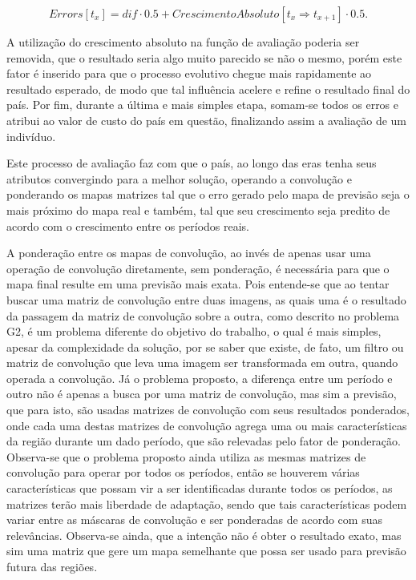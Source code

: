 \begin{equation}
\label{eq:forecasVectortError}
	Errors[t_x] = dif \cdot 0.5 + CrescimentoAbsoluto[t_x \Rightarrow t_{x+1}] \cdot 0.5.
\end{equation}

	A utilização do crescimento absoluto na função de avaliação poderia ser removida, que o resultado seria algo muito parecido se não o mesmo, porém este fator é inserido para que o processo evolutivo chegue mais rapidamente ao resultado esperado, de modo que tal influência acelere e refine o resultado final do país. Por fim, durante a última e mais simples etapa, somam-se todos os erros e atribui ao valor de custo do país em questão, finalizando assim a avaliação de um indivíduo. 

Este processo de avaliação faz com que o país, ao longo das eras tenha seus atributos convergindo para a melhor solução, operando a convolução e ponderando os mapas matrizes tal que o erro gerado pelo mapa de previsão seja o mais próximo do mapa real e também, tal que seu crescimento seja predito de acordo com o crescimento entre os períodos reais. 

A ponderação entre os mapas de convolução, ao invés de apenas usar uma operação de convolução diretamente, sem ponderação, é necessária para que o mapa final resulte em uma previsão mais exata. Pois entende-se que ao tentar buscar uma matriz de convolução entre duas imagens, as quais uma é o resultado da passagem da matriz de convolução sobre a outra, como descrito no problema G2, é um problema diferente do objetivo do trabalho, o qual é mais simples, apesar da complexidade da solução, por se saber que existe, de fato, um filtro ou matriz de convolução que leva uma imagem ser transformada em outra, quando operada a convolução. Já o problema proposto, a diferença entre um período e outro não é apenas a busca por uma matriz de convolução, mas sim a previsão, que para isto, são usadas matrizes de convolução com seus resultados ponderados, onde cada uma destas matrizes de convolução agrega uma ou mais características da região durante um dado período, que são relevadas pelo fator de ponderação. Observa-se que o problema proposto ainda utiliza as mesmas matrizes de convolução para operar por todos os períodos, então se houverem várias características que possam vir a ser identificadas durante todos os períodos, as matrizes terão mais liberdade de adaptação, sendo que tais características podem variar entre as máscaras de convolução e ser ponderadas de acordo com suas relevâncias. Observa-se ainda, que a intenção não é obter o resultado exato, mas sim uma matriz que gere um mapa semelhante que possa ser usado para previsão futura das regiões.

